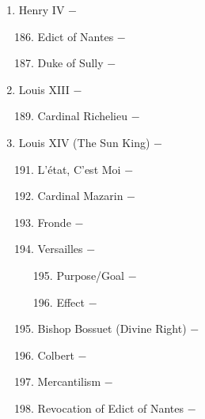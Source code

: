 \documentclass[12pt]{article}
\begin{document}
\begin{enumerate}
\item Henry IV $-$

\begin{enumerate}[label=\arabic{*}.]
\setcounter{enumii}{185}

\item Edict of Nantes $-$ 

\item Duke of Sully $-$

\end{enumerate} 
\setcounter{enumi}{187}

\item Louis XIII $-$

\begin{enumerate}[label=\arabic{*}.]
\setcounter{enumii}{188}

\item Cardinal Richelieu $-$ 

\end{enumerate}
\setcounter{enumi}{189}

\item Louis XIV (The Sun King) $-$

\begin{enumerate}[label=\arabic{*}.]
\setcounter{enumii}{190}
\item L'\'etat, C'est Moi $-$

\item Cardinal Mazarin $-$ 

\item Fronde $-$ 

\item Versailles $-$

\begin{enumerate}[label=\arabic{*}.]
\setcounter{enumiii}{194}

\item Purpose/Goal $-$

\item Effect $-$

\end{enumerate}
\setcounter{enumii}{196}

\item Bishop Bossuet (Divine Right) $-$

\item Colbert $-$ 

\item Mercantilism $-$ 

\item Revocation of Edict of Nantes $-$ 


\end{enumerate}
\end{enumerate}
\end{document}
